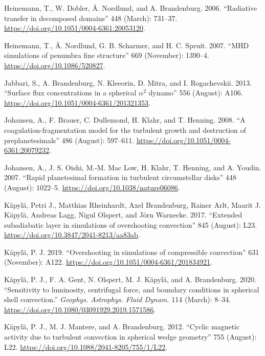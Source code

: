 \documentclass[10pt,a4paper,onecolumn]{article}
\begin{document}
\leavevmode\hypertarget{ref-2006Aux5cux26A.448.731H}{}%
Heinemann, T., W. Dobler, Å. Nordlund, and A. Brandenburg. 2006.
``Radiative transfer in decomposed domains'' 448 (March): 731--37.
\url{https://doi.org/10.1051/0004-6361:20053120}.

\leavevmode\hypertarget{ref-2007ApJ.669.1390H}{}%
Heinemann, T., Å. Nordlund, G. B. Scharmer, and H. C. Spruit. 2007.
``MHD simulations of penumbra fine structure'' 669 (November): 1390--4.
\url{https://doi.org/10.1086/520827}.

\leavevmode\hypertarget{ref-2013Aux5cux26A.556A.106J}{}%
Jabbari, S., A. Brandenburg, N. Kleeorin, D. Mitra, and I. Rogachevskii.
2013. ``Surface flux concentrations in a spherical \(\alpha\)\(^{2}\)
dynamo'' 556 (August): A106.
\url{https://doi.org/10.1051/0004-6361/201321353}.

\leavevmode\hypertarget{ref-2008Aux5cux26A.486.597J}{}%
Johansen, A., F. Brauer, C. Dullemond, H. Klahr, and T. Henning. 2008.
``A coagulation-fragmentation model for the turbulent growth and
destruction of preplanetesimals'' 486 (August): 597--611.
\url{https://doi.org/10.1051/0004-6361:20079232}.

\leavevmode\hypertarget{ref-2007Natur.448.1022J}{}%
Johansen, A., J. S. Oishi, M.-M. Mac Low, H. Klahr, T. Henning, and A.
Youdin. 2007. ``Rapid planetesimal formation in turbulent circumstellar
disks'' 448 (August): 1022--5.
\url{https://doi.org/10.1038/nature06086}.

\leavevmode\hypertarget{ref-2017ApJ.845.23K}{}%
Käpylä, Petri J., Matthias Rheinhardt, Axel Brandenburg, Rainer Arlt,
Maarit J. Käpylä, Andreas Lagg, Nigul Olspert, and Jörn Warnecke. 2017.
``Extended subadiabatic layer in simulations of overshooting
convection'' 845 (August): L23.
\url{https://doi.org/10.3847/2041-8213/aa83ab}.

\leavevmode\hypertarget{ref-2019Aux5cux26A.631.122K}{}%
Käpylä, P. J. 2019. ``Overshooting in simulations of compressible
convection'' 631 (November): A122.
\url{https://doi.org/10.1051/0004-6361/201834921}.

\leavevmode\hypertarget{ref-2020GApFD.114.8K}{}%
Käpylä, P. J., F. A. Gent, N. Olspert, M. J. Käpylä, and A. Brandenburg.
2020. ``Sensitivity to luminosity, centrifugal force, and boundary
conditions in spherical shell convection.'' \emph{Geophys. Astrophys.
Fluid Dynam.} 114 (March): 8--34.
\url{https://doi.org/10.1080/03091929.2019.1571586}.

\leavevmode\hypertarget{ref-2012ApJ.755L.22K}{}%
Käpylä, P. J., M. J. Mantere, and A. Brandenburg. 2012. ``Cyclic
magnetic activity due to turbulent convection in spherical wedge
geometry'' 755 (August): L22.
\url{https://doi.org/10.1088/2041-8205/755/1/L22}.
\end{document}
